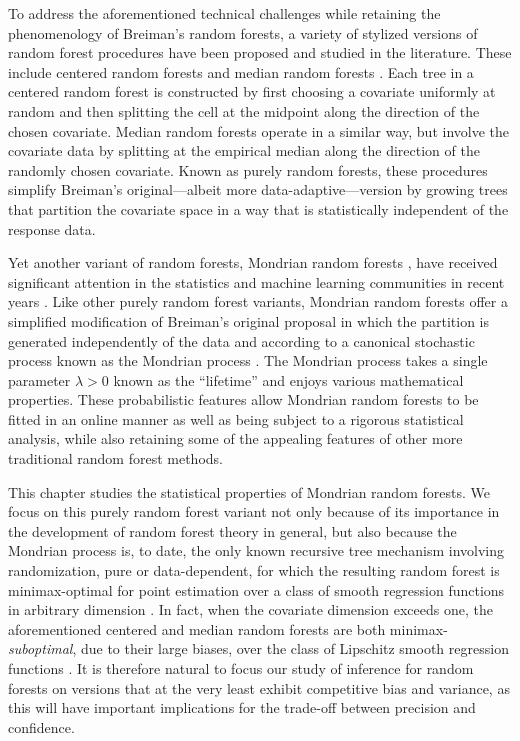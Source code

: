 \documentclass[11pt,lof]{puthesis}
\theoremstyle{break}
\theoremstyle{proof}
\begin{document}
To address the aforementioned technical challenges while retaining the
phenomenology of Breiman's random forests, a variety of stylized versions of
random forest procedures have been proposed and studied in the literature.
These include centered random forests
\citep{biau2012analysis,arnould2023interpolation} and median random forests
\citep{duroux2018impact,arnould2023interpolation}. Each tree in a centered
random forest is constructed by first choosing a covariate uniformly at random
and then splitting the cell at the midpoint along the direction of the chosen
covariate. Median random forests operate in a similar way, but involve the
covariate data by splitting at the empirical median along the direction of the
randomly chosen covariate. Known as purely random forests, these procedures
simplify Breiman's original---albeit more data-adaptive---version by growing
trees that partition the covariate space in a way that is statistically
independent of the response data.

Yet another variant of random forests, Mondrian random forests
\citep{lakshminarayanan2014mondrian}, have received significant attention in
the statistics and machine learning communities in recent years
\citep{ma2020isolation, mourtada2020minimax, scillitoe2021uncertainty,
mourtada2021amf, vicuna2021reducing, gao2022towards, oreilly2022stochastic}.
Like
other purely random forest variants, Mondrian random forests offer a simplified
modification of Breiman's original proposal in which the partition is generated
independently of the data and according to a canonical stochastic process known
as the Mondrian process \citep{roy2008mondrian}. The Mondrian process takes a
single parameter $\lambda > 0$ known as the ``lifetime'' and enjoys various
mathematical properties. These probabilistic
features allow Mondrian random forests to be
fitted in an online manner as well as being subject to a rigorous statistical
analysis, while also retaining some of the appealing features of other
more traditional random forest methods.

This chapter studies the statistical properties of Mondrian random forests. We
focus on this purely random forest variant not only because of its importance
in the development of random forest theory in general, but also because the
Mondrian process is, to date, the only known recursive tree mechanism involving
randomization, pure or data-dependent, for which the resulting random forest is
minimax-optimal for point estimation over a class of smooth regression
functions in arbitrary dimension \citep{mourtada2020minimax}. In fact, when the
covariate dimension exceeds one, the aforementioned centered and median random
forests are both minimax-\emph{suboptimal}, due to their large biases, over the
class of Lipschitz smooth regression functions \citep{klusowski2021sharp}. It
is therefore natural to focus our study of inference for random forests on
versions that at the very least exhibit competitive bias and variance, as this
will have important implications for the trade-off between precision and
confidence.
\end{document}
